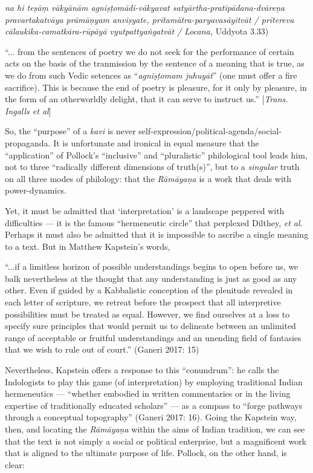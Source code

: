 \newpage

\begin{myquote}
{{\sl na hi teṣāṃ vākyānām agniṣṭomādi-vākyavat satyārtha-pratipādana-dvāreṇa pravartakatvāya prāmāṇyam anviṣyate, prītamātra-paryavasāyitvāt / prītereva cālaukika-camatkāra-rūpāyā vyutpattyaṅgatvāt / Locana,}} Uddyota 3.33)


 “... from the sentences of poetry we do not seek for the performance of certain acts on the basis of the tranmission by the sentence of a meaning that is true, as we do from such Vedic setences as “{\sl agniṣṭomam juhuyāt}” (one must offer a fire sacrifice). This is because the end of poetry is pleasure, for it only by pleasure, in the form of an otherworldly delight, that it can serve to instruct us.”
\hfill  [{\sl Trans. Ingalls et al}]
\end{myquote}

So, the “purpose” of a {\sl kavi} is never self-expression/political-agenda/\-social-propaganda. It is unfortunate and ironical in equal measure that the “application” of Pollock’s “inclusive” and “pluralistic” philological tool leads him, not to three “radically different dimensions of truth(s)”, but to a {\sl singular} truth on all three modes of philology: that the {\sl Rāmāyaṇa} is a work that deals with power-dynamics. 

Yet, it must be admitted that ‘interpretation’ is a landscape peppered with difficulties — it is the famous “hermeneutic circle” that perplexed Dilthey, {\sl et al}. Perhaps it must also be admitted that it is impossible to ascribe a single meaning to a text. But in Matthew Kapstein’s words, 

\begin{myquote}
“...if a limitless horizon of possible understandings begins to open before us, we balk nevertheless at the thought that any understanding is just as good as any other. Even if guided by a Kabbalistic conception of the plenitude revealed in each letter of scripture, we retreat before the prospect that all interpretive possibilities must be treated as equal. However, we find ourselves at a loss to specify sure principles that would permit us to delineate between an unlimited range of acceptable or fruitful understandings and an unending field of fantasies that we wish to rule out of court.”
\hfill (Ganeri 2017: 15) 
\end{myquote}

Nevertheless, Kapstein offers a response to this “conundrum”: he calls the Indologists to play this game (of interpretation) by employing traditional Indian hermeneutics — “whether embodied in written commentaries or in the living expertise of traditionally educated scholars” — as a compass to “forge pathways through a conceptual topography” (Ganeri 2017: 16). Going the Kapstein way, then, and locating the {\sl Rāmāyaṇa} within the aims of Indian tradition, we can see that the text is not simply a social or political enterprise, but a magnificent work that is aligned to the ultimate purpose of life. Pollock, on the other hand, is clear:

